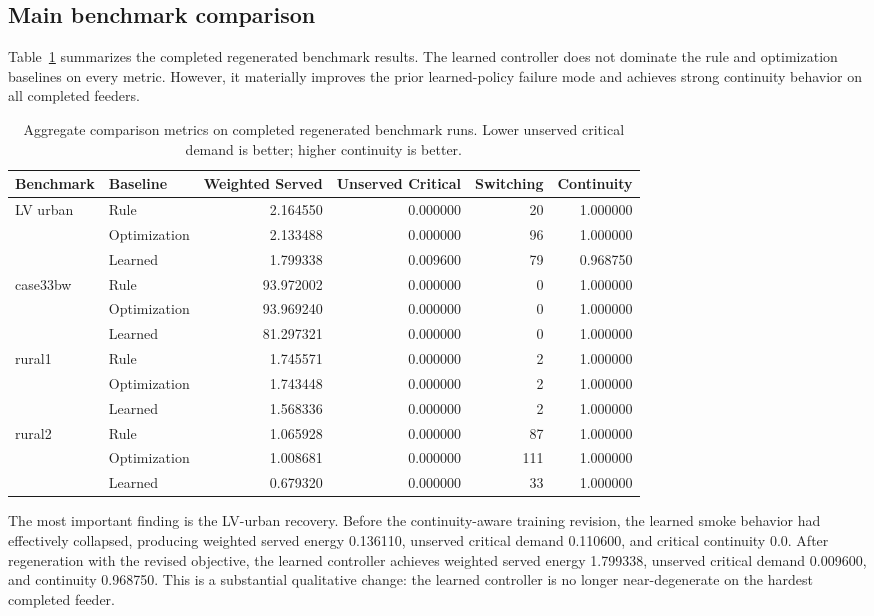 \documentclass[11pt]{article}
\begin{document}
\subsection{Main benchmark comparison}

Table~\ref{tab:main-results} summarizes the completed regenerated benchmark results. The learned controller does not dominate the rule and optimization baselines on every metric. However, it materially improves the prior learned-policy failure mode and achieves strong continuity behavior on all completed feeders.

\begin{table}[t]
\centering
\small
\caption{Aggregate comparison metrics on completed regenerated benchmark runs. Lower unserved critical demand is better; higher continuity is better.}
\label{tab:main-results}
\begin{tabular}{llrrrr}
\toprule
Benchmark & Baseline & Weighted Served & Unserved Critical & Switching & Continuity \\
\midrule
\multirow{3}{*}{LV urban}
& Rule & 2.164550 & 0.000000 & 20 & 1.000000 \\
& Optimization & 2.133488 & 0.000000 & 96 & 1.000000 \\
& Learned & 1.799338 & 0.009600 & 79 & 0.968750 \\
\midrule
\multirow{3}{*}{case33bw}
& Rule & 93.972002 & 0.000000 & 0 & 1.000000 \\
& Optimization & 93.969240 & 0.000000 & 0 & 1.000000 \\
& Learned & 81.297321 & 0.000000 & 0 & 1.000000 \\
\midrule
\multirow{3}{*}{rural1}
& Rule & 1.745571 & 0.000000 & 2 & 1.000000 \\
& Optimization & 1.743448 & 0.000000 & 2 & 1.000000 \\
& Learned & 1.568336 & 0.000000 & 2 & 1.000000 \\
\midrule
\multirow{3}{*}{rural2}
& Rule & 1.065928 & 0.000000 & 87 & 1.000000 \\
& Optimization & 1.008681 & 0.000000 & 111 & 1.000000 \\
& Learned & 0.679320 & 0.000000 & 33 & 1.000000 \\
\bottomrule
\end{tabular}
\end{table}

The most important finding is the LV-urban recovery. Before the continuity-aware training revision, the learned smoke behavior had effectively collapsed, producing weighted served energy 0.136110, unserved critical demand 0.110600, and critical continuity 0.0. After regeneration with the revised objective, the learned controller achieves weighted served energy 1.799338, unserved critical demand 0.009600, and continuity 0.968750. This is a substantial qualitative change: the learned controller is no longer near-degenerate on the hardest completed feeder.
\end{document}
